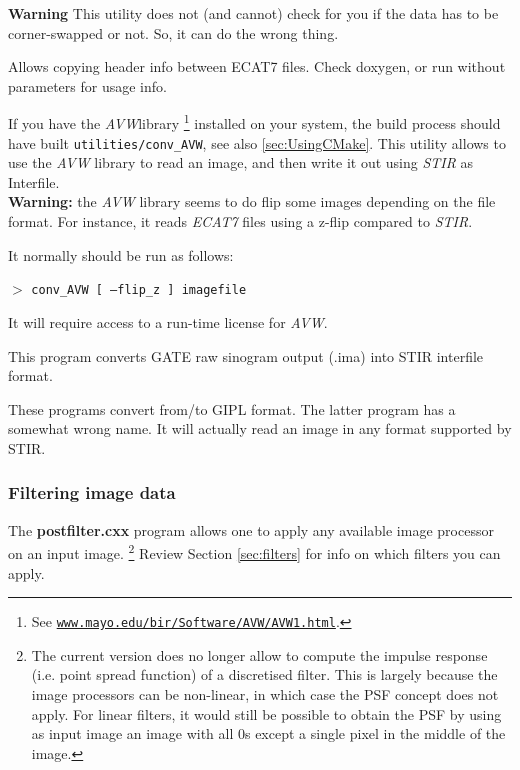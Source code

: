 \documentclass{article}
\def\R2Lurl#1#2{\mbox{\href{#1}{\tt #2}}}
\newcommand{\cmdline}[1]{\par \noindent $>$ \texttt{#1}\par}
\begin{document}
\textbf{Warning} This utility does not (and cannot) check for you 
if the data has to be corner-swapped or not. So, it can do the 
wrong thing.

{ 
}
Allows copying header info between ECAT7 files. Check doxygen, or run without 
parameters for usage info.

{ 
}

\label{sec:convAVW}
If you have the \textit{AVW}\texttrademark  library
\footnote{See \R2Lurl{http://www.mayo.edu/bir/Software/AVW/AVW1.html}
{www.mayo.edu/bir/Software/AVW/AVW1.html}.
} installed on your system, the build process should have built \texttt{utilities/conv\_AVW},
see also \ref{sec:UsingCMake}.
This utility allows to use the \textit{AVW} library to read an image, and then write it out
using \textit{STIR} as Interfile.\\
\textbf{Warning:} the \textit{AVW} library seems to do flip some images depending
on the file format. For instance, it reads \textit{ECAT7} files using a z-flip compared
to \textit{STIR}.

It normally should be run as follows:
\cmdline{conv\_AVW [ --flip\_z ] imagefile}

It will require access to a run-time license for \textit{AVW}.

{ 
}

This program converts GATE raw sinogram output (.ima) into STIR interfile format. 

{ 
}

These programs convert from/to GIPL format. The latter program has a somewhat wrong name.
It will actually read an image in any format supported by STIR.


\subsubsection{
Filtering image data}

The \textbf{postfilter.cxx} program allows one to apply any available 
image processor on an input image. \footnote{{\small The current version 
does no longer allow to compute the impulse response (i.e. point 
spread function) of a discretised filter. This is largely because 
the image processors can be non-linear, in which case the PSF 
concept does not apply. For linear filters, it would still be 
possible to obtain the PSF by using as input image an image with 
all 0s except a single pixel in the middle of the image.}} Review 
Section \ref{sec:filters} for info on which filters you can apply.
\end{document}
